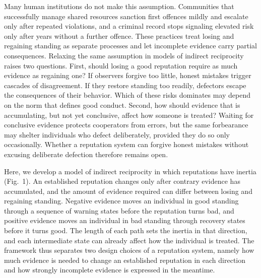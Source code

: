 \documentclass[11pt]{article}
\begin{document}
Many human institutions do not make this assumption. Communities that successfully manage shared resources sanction first offences mildly and escalate only after repeated violations\cite{ostrom1990,cox2010}, and a criminal record stops signaling elevated risk only after years without a further offence\cite{blumstein2009}. These practices treat losing and regaining standing as separate processes and let incomplete evidence carry partial consequences. Relaxing the same assumption in models of indirect reciprocity raises two questions. First, should losing a good reputation require as much evidence as regaining one? If observers forgive too little, honest mistakes trigger cascades of disagreement. If they restore standing too readily, defectors escape the consequences of their behavior. Which of these risks dominates may depend on the norm that defines good conduct. Second, how should evidence that is accumulating, but not yet conclusive, affect how someone is treated? Waiting for conclusive evidence protects cooperators from errors, but the same forbearance may shelter individuals who defect deliberately, provided they do so only occasionally\cite{schmid2021,michelmata2024}. Whether a reputation system can forgive honest mistakes without excusing deliberate defection therefore remains open.

Here, we develop a model of indirect reciprocity in which reputations have inertia (Fig.~1). An established reputation changes only after contrary evidence has accumulated, and the amount of evidence required can differ between losing and regaining standing. Negative evidence moves an individual in good standing through a sequence of warning states before the reputation turns bad, and positive evidence moves an individual in bad standing through recovery states before it turns good. The length of each path sets the inertia in that direction, and each intermediate state can already affect how the individual is treated. The framework thus separates two design choices of a reputation system, namely how much evidence is needed to change an established reputation in each direction and how strongly incomplete evidence is expressed in the meantime.
\end{document}
